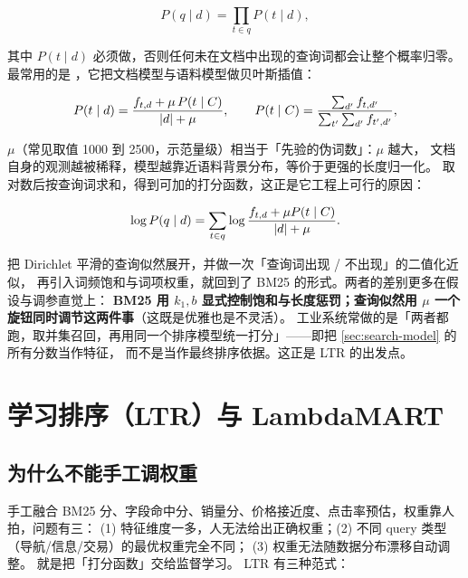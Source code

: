 \begin{equation}
P(q \mid d) = \prod_{t \in q} P(t \mid d) ,
\label{eq:ql}
\end{equation}

其中 $P(t \mid d)$ 必须做，否则任何未在文档中出现的查询词都会让整个概率归零。
最常用的是 ，它把文档模型与语料模型做贝叶斯插值：

\begin{equation}
P(t \mid d) = \frac{f_{t,d} + \mu \, P(t \mid C)}{\left\lvert d \right\rvert + \mu} ,
\qquad P(t \mid C) = \frac{\sum_{d'} f_{t,d'}}{\sum_{t'} \sum_{d'} f_{t',d'}} ,
\label{eq:dirichlet}
\end{equation}

$\mu$（常见取值 1000 到 2500，示范量级）相当于「先验的伪词数」：$\mu$ 越大，
文档自身的观测越被稀释，模型越靠近语料背景分布，等价于更强的长度归一化。
取对数后按查询词求和，得到可加的打分函数，这正是它工程上可行的原因：

\begin{equation}
\log P(q \mid d) = \sum_{t \in q} \log \frac{f_{t,d} + \mu P(t \mid C)}{\left\lvert d \right\rvert + \mu} .
\label{eq:dirlog}
\end{equation}

\begin{insight}
把 Dirichlet 平滑的查询似然展开，并做一次「查询词出现 / 不出现」的二值化近似，
再引入词频饱和与词项权重，就回到了 BM25 的形式。两者的差别更多在假设与调参直觉上：
\textbf{BM25 用 $k_1, b$ 显式控制饱和与长度惩罚；查询似然用 $\mu$ 一个旋钮同时调节这两件事}（这既是优雅也是不灵活）。
工业系统常做的是「两者都跑，取并集召回，再用同一个排序模型统一打分」——即把 \cref{sec:search-model} 的所有分数当作特征，
而不是当作最终排序依据。这正是 LTR 的出发点。
\end{insight}

\section{学习排序（LTR）与 LambdaMART}

\subsection{为什么不能手工调权重}

手工融合 BM25 分、字段命中分、销量分、价格接近度、点击率预估，权重靠人拍，问题有三：
(1) 特征维度一多，人无法给出正确权重；(2) 不同 query 类型（导航/信息/交易）的最优权重完全不同；
(3) 权重无法随数据分布漂移自动调整。 就是把「打分函数」交给监督学习。
LTR 有三种范式\cite{manning2008ir,chapelle2014simple}：

